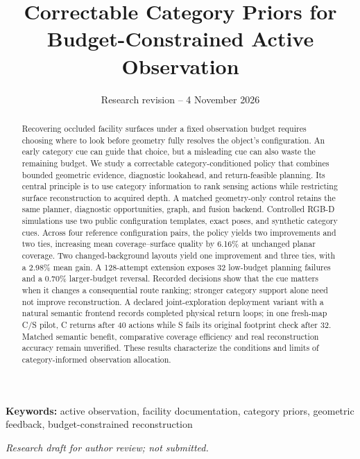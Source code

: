 \documentclass[11pt,a4paper]{article}
\begin{document}
\title{Correctable Category Priors for Budget-Constrained Active Observation}
\author{}
\date{Research revision -- 4 November 2026}
\maketitle
\begin{abstract}
Recovering occluded facility surfaces under a fixed observation budget requires choosing where to look before geometry fully resolves the object's configuration. An early category cue can guide that choice, but a misleading cue can also waste the remaining budget. We study a correctable category-conditioned policy that combines bounded geometric evidence, diagnostic lookahead, and return-feasible planning. Its central principle is to use category information to rank sensing actions while restricting surface reconstruction to acquired depth. A matched geometry-only control retains the same planner, diagnostic opportunities, graph, and fusion backend. Controlled RGB-D simulations use two public configuration templates, exact poses, and synthetic category cues. Across four reference configuration pairs, the policy yields two improvements and two ties, increasing mean coverage--surface quality by 6.16\% at unchanged planar coverage. Two changed-background layouts yield one improvement and three ties, with a 2.98\% mean gain. A 128-attempt extension exposes 32 low-budget planning failures and a 0.70\% larger-budget reversal. Recorded decisions show that the cue matters when it changes a consequential route ranking; stronger category support alone need not improve reconstruction. A declared joint-exploration deployment variant with a natural semantic frontend records completed physical return loops; in one fresh-map C/S pilot, C returns after 40 actions while S fails its original footprint check after 32. Matched semantic benefit, comparative coverage efficiency and real reconstruction accuracy remain unverified. These results characterize the conditions and limits of category-informed observation allocation.
\end{abstract}
\noindent\textbf{Keywords:} active observation, facility documentation, category priors, geometric feedback, budget-constrained reconstruction

\noindent\textit{Research draft for author review; not submitted.}
\end{document}

